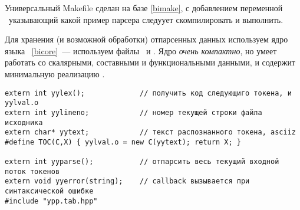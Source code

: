 \label{syntax}\secdown

\label{lexmake}

Универсальный Makefile сделан на базе \ref{bimake}, с добавлением переменной
\ указывающий какой пример парсера следуует скомпилировать и выполнить.

Для хранения (и возможной обработки) отпарсенных данных используем ядро языка
\bi\ \ref{bicore}\ --- используем файлы \ и
. Ядро \emph{очень компактно}, но умеет работать со
скалярными, составными и функциональными данными, и содержит минимальную
реализацию .


\label{lexinterface}

\begin{verbatim}
extern int yylex();             // получить код следующиго токена, и yylval.o 
extern int yylineno;            // номер текущей строки файла исходника
extern char* yytext;            // текст распознанного токена, asciiz
#define TOC(C,X) { yylval.o = new C(yytext); return X; }

extern int yyparse();           // отпарсить весь текущий входной поток токенов
extern void yyerror(string);    // callback вызывается при синтаксической ошибке
#include "ypp.tab.hpp"
\end{verbatim}





\secup